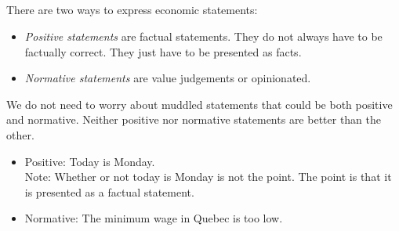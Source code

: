 \subsection{}

There are two ways to express economic statements:
\begin{itemize}
    \item \begin{definition}
        \emph{Positive statements} are factual statements. They do not always have to be factually correct.
        They just have to be presented as facts.
    \end{definition}
    \item \begin{definition}
        \emph{Normative statements} are value judgements or opinionated.
    \end{definition}
\end{itemize}
We do not need to worry about muddled statements that could be both positive and normative.
Neither positive nor normative statements are better than the other.
\begin{example}
    \begin{itemize}
        \item Positive: Today is Monday.\\
        Note: Whether or not today is Monday is not the point. The point is that it is presented as a factual statement.
        \item Normative: The minimum wage in Quebec is too low.
    \end{itemize}
\end{example}